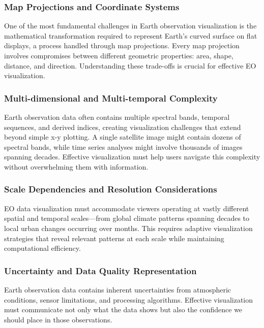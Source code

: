 \subsubsection{Map Projections and Coordinate Systems}

One of the most fundamental challenges in Earth observation visualization is the mathematical transformation required to represent Earth's curved surface on flat displays, a process handled through map projections. Every map projection involves compromises between different geometric properties: area, shape, distance, and direction. Understanding these trade-offs is crucial for effective EO visualization.

\subsubsection{Multi-dimensional and Multi-temporal Complexity}

Earth observation data often contains multiple spectral bands, temporal sequences, and derived indices, creating visualization challenges that extend beyond simple x-y plotting. A single satellite image might contain dozens of spectral bands, while time series analyses might involve thousands of images spanning decades. Effective visualization must help users navigate this complexity without overwhelming them with information.

\subsubsection{Scale Dependencies and Resolution Considerations}

EO data visualization must accommodate viewers operating at vastly different spatial and temporal scales—from global climate patterns spanning decades to local urban changes occurring over months. This requires adaptive visualization strategies that reveal relevant patterns at each scale while maintaining computational efficiency.

\subsubsection{Uncertainty and Data Quality Representation}

Earth observation data contains inherent uncertainties from atmospheric conditions, sensor limitations, and processing algorithms. Effective visualization must communicate not only what the data shows but also the confidence we should place in those observations.

